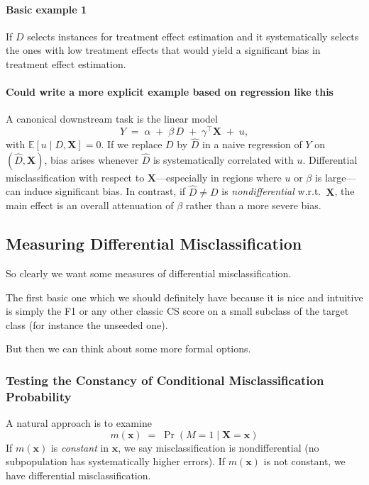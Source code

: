 \documentclass[11pt]{article}
\begin{document}
\paragraph{Basic example 1}
If $D$ selects instances for treatment effect estimation and it systematically selects the ones with low treatment effects that would yield a significant bias in treatment effect estimation.

\paragraph{Could write a more explicit example based on regression like this}
A canonical downstream task is the linear model
\[
  Y \;=\; \alpha \;+\; \beta\,D \;+\; \gamma^\top \mathbf{X} \;+\; u,
\]
with $\mathbb{E}[u \mid D,\mathbf{X}] = 0.$ If we replace $D$ by $\widehat{D}$ in a naive regression of $Y$ on $(\widehat{D}, \mathbf{X})$, bias arises whenever $\widehat{D}$ is systematically correlated with $u$. Differential misclassification with respect to $\mathbf{X}$---especially in regions where $u$ or $\beta$ is large---can induce significant bias. In contrast, if $\widehat{D}\neq D$ is \emph{nondifferential} w.r.t.\ $\mathbf{X}$, the main effect is an overall attenuation of $\beta$ rather than a more severe bias.

\subsection*{Measuring Differential Misclassification}

So clearly we want some measures of differential misclassification.


The first basic one which we should definitely have because it is nice and intuitive is simply the F1 or any other classic CS score on a small subclass of the target class (for instance the unseeded one).


But then we can think about some more formal options.

\subsubsection*{Testing the Constancy of Conditional Misclassification Probability}

A natural approach is to examine 
\[
  m(\mathbf{x}) \;=\; \Pr(M=1 \mid \mathbf{X}=\mathbf{x})
\]
If $m(\mathbf{x})$ is \emph{constant} in $\mathbf{x}$, we say misclassification is nondifferential (no subpopulation has systematically higher errors). If $m(\mathbf{x})$ is not constant, we have differential misclassification.
\end{document}
